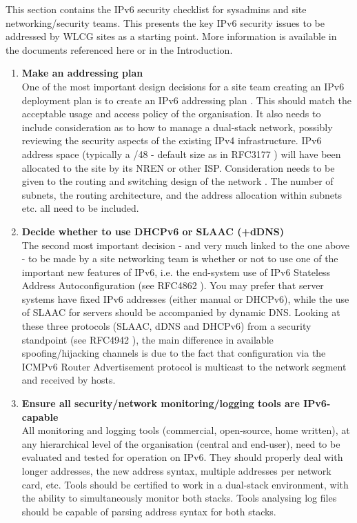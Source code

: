 
This section contains the IPv6 security checklist for sysadmins and site
networking/security teams. This presents the key IPv6 security issues to be
addressed by WLCG sites as a starting point. More information is available in
the documents referenced here or in the Introduction. 



\begin{enumerate}


\item {\bf Make an addressing plan}\\
One of the most important design decisions for a site team creating
an IPv6 deployment plan is to create an IPv6 addressing plan \cite{planningguides}.
This should match the acceptable usage and access policy of the organisation.
It also needs to include consideration as to how to manage a dual-stack network,
possibly reviewing the security aspects of the existing IPv4 infrastructure.
IPv6 address space (typically a /48 - default size as in RFC3177 \cite{rfc})
will have been allocated to the site by its NREN or other ISP. Consideration
needs to be given to the routing and switching design of the network
\cite{planningguides}. The number of subnets, the routing architecture,
and the address allocation within subnets etc. all need to be included. 


\item {\bf Decide whether to use DHCPv6 or SLAAC (+dDNS)} \\
The second most important decision - and very much linked to the one above -
to be made by a site networking team is whether or not to use one of the important
new features of IPv6, i.e. the end-system use of  IPv6 Stateless Address
Autoconfiguration (see RFC4862 \cite{rfc}).
You may prefer that server systems have fixed IPv6 addresses
(either manual or DHCPv6), while the use of SLAAC for servers
should be accompanied by
dynamic DNS. Looking at these three protocols (SLAAC, dDNS and DHCPv6) from a
security standpoint (see RFC4942 \cite{rfc}), the main difference in available
spoofing/hijacking channels is due to the fact that configuration via the ICMPv6
Router Advertisement protocol is multicast to the network segment and received
by hosts.


\item {\bf Ensure all security/network monitoring/logging tools are IPv6-capable}\\
All monitoring and logging tools (commercial, open-source, home written),
at any hierarchical level of the organisation (central and end-user),
need to be evaluated and tested for operation on IPv6.
They should properly deal with longer addresses, the new address syntax, multiple
addresses per network card, etc.
Tools should be certified to work in a dual-stack environment, with the
ability to simultaneously monitor both stacks. Tools analysing log files
should be capable of parsing address syntax for both stacks.


\end{enumerate}
